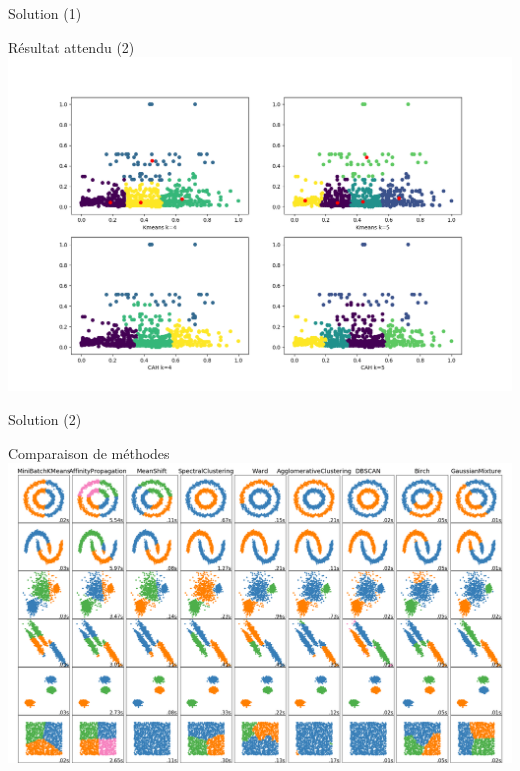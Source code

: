 \documentclass[11pt]{beamer}
\newcommand{\Pythonsmall}[1]{
	{\scriptsize }
}
\begin{document}
\begin{frame}{Solution (1)}
\Pythonsmall{ex505}
\end{frame}


\begin{frame}{Résultat attendu (2)}
\includegraphics[scale=0.3]{ex506}
\end{frame}

\begin{frame}{Solution (2)}
\Pythonsmall{ex506}
\end{frame}

\begin{frame}{Comparaison de méthodes}
\includegraphics[scale=0.2]{cluster_comparison}
\end{frame}
\end{document}
